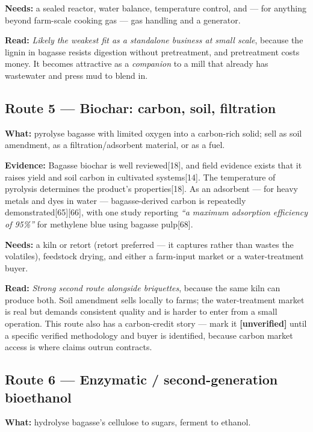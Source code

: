 \documentclass[11pt]{article}
\newcommand{\src}[1]{[#1]}
\begin{document}
\textbf{Needs:} a sealed reactor, water balance, temperature control, and ---
for anything beyond farm-scale cooking gas --- gas handling and a generator.

\textbf{Read:} \emph{Likely the weakest fit as a standalone business at small
scale}, because the lignin in bagasse resists digestion without pretreatment,
and pretreatment costs money. It becomes attractive as a \emph{companion} to a
mill that already has wastewater and press mud to blend in.

\subsection{Route 5 --- Biochar: carbon, soil, filtration}

\textbf{What:} pyrolyse bagasse with limited oxygen into a carbon-rich solid;
sell as soil amendment, as a filtration/adsorbent material, or as a fuel.

\textbf{Evidence:} Bagasse biochar is well reviewed\src{18}, and field evidence
exists that it raises yield and soil carbon in cultivated systems\src{14}. The
temperature of pyrolysis determines the product's properties\src{18}. As an
adsorbent --- for heavy metals and dyes in water --- bagasse-derived carbon is
repeatedly demonstrated\src{65}\src{66}, with one study reporting \emph{``a
maximum adsorption efficiency of 95\%''} for methylene blue using bagasse
pulp\src{68}.

\textbf{Needs:} a kiln or retort (retort preferred --- it captures rather than
wastes the volatiles), feedstock drying, and either a farm-input market or a
water-treatment buyer.

\textbf{Read:} \emph{Strong second route alongside briquettes}, because the same
kiln can produce both. Soil amendment sells locally to farms; the
water-treatment market is real but demands consistent quality and is harder to
enter from a small operation. This route also has a carbon-credit story ---
mark it \textbf{[unverified]} until a specific verified methodology and buyer is
identified, because carbon market access is where claims outrun contracts.

\subsection{Route 6 --- Enzymatic / second-generation bioethanol}

\textbf{What:} hydrolyse bagasse's cellulose to sugars, ferment to ethanol.
\end{document}
